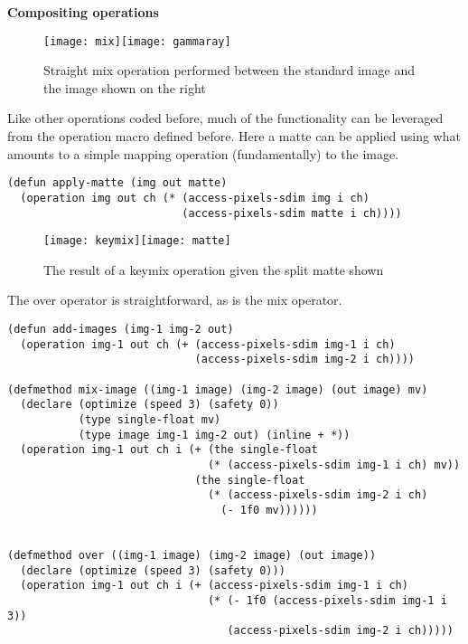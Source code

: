 \documentclass[11pt]{report}
\begin{document}
\bigskip
\textbf{Compositing operations}

\begin{figure}[h!]
\centering
    \texttt{[image: mix]}\texttt{[image: gammaray]}
\caption{Straight mix operation performed between the standard image and the
         image shown on the right}
\end{figure}

Like other operations coded before, much of the functionality can be leveraged
from the operation macro defined before. Here a matte can be applied using what
amounts to a simple mapping operation (fundamentally) to the image.

\begin{lstlisting}
(defun apply-matte (img out matte)
  (operation img out ch (* (access-pixels-sdim img i ch)
                           (access-pixels-sdim matte i ch))))
\end{lstlisting}

\begin{figure}[h!]
\centering
    \texttt{[image: keymix]}\texttt{[image: matte]}
\caption{The result of a keymix operation given the split matte shown}
\end{figure}

The over operator is straightforward, as is the mix operator.

\begin{lstlisting}
(defun add-images (img-1 img-2 out)
  (operation img-1 out ch (+ (access-pixels-sdim img-1 i ch)
                             (access-pixels-sdim img-2 i ch))))

(defmethod mix-image ((img-1 image) (img-2 image) (out image) mv)
  (declare (optimize (speed 3) (safety 0))
           (type single-float mv)
           (type image img-1 img-2 out) (inline + *))
  (operation img-1 out ch i (+ (the single-float
                               (* (access-pixels-sdim img-1 i ch) mv))
                             (the single-float
                               (* (access-pixels-sdim img-2 i ch)
                                 (- 1f0 mv))))))


(defmethod over ((img-1 image) (img-2 image) (out image))
  (declare (optimize (speed 3) (safety 0)))
  (operation img-1 out ch i (+ (access-pixels-sdim img-1 i ch)
                               (* (- 1f0 (access-pixels-sdim img-1 i 3))
                                  (access-pixels-sdim img-2 i ch)))))
\end{lstlisting}
\end{document}

